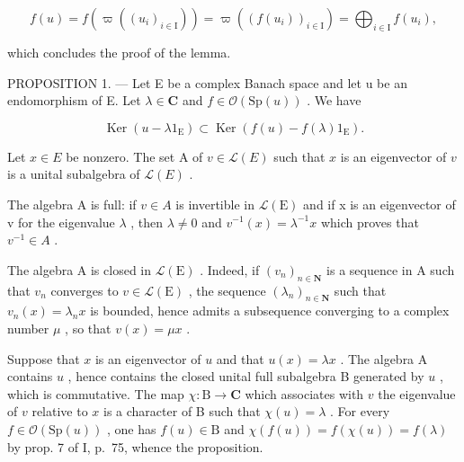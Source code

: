 \[
f (u) = f (\varpi ((u _ {i}) _ {i \in \mathrm{I}})) = \varpi ((f (u _ {i})) _ {i \in \mathrm{I}}) = \bigoplus_ {i \in \mathrm{I}} f (u _ {i}),
\]

which concludes the proof of the lemma.

PROPOSITION 1. --- Let E be a complex Banach space and let u be an endomorphism of E. Let \(\lambda \in \mathbf{C}\) and \(f \in \mathcal{O}(\mathrm{Sp}(u))\) . We have

\[
\operatorname{Ker} (u - \lambda 1 _ {\mathrm{E}}) \subset \operatorname{Ker} (f (u) - f (\lambda) 1 _ {\mathrm{E}}).
\]

Let \(x \in E\) be nonzero. The set A of \(v \in \mathcal{L}(E)\) such that \(x\) is an eigenvector of \(v\) is a unital subalgebra of \(\mathcal{L}(E)\) .

The algebra A is full: if \(v \in A\) is invertible in \(\mathcal{L}(\mathrm{E})\) and if x is an eigenvector of v for the eigenvalue \(\lambda\) , then \(\lambda \neq 0\) and \(v^{-1}(x) = \lambda^{-1}x\) which proves that \(v^{-1} \in A\) .

The algebra A is closed in \(\mathcal{L}(\mathrm{E})\) . Indeed, if \((v_n)_{n\in \mathbf{N}}\) is a sequence in A such that \(v_{n}\) converges to \(v\in \mathcal{L}(\mathrm{E})\) , the sequence \((\lambda_{n})_{n\in \mathbf{N}}\) such that \(v_{n}(x) = \lambda_{n}x\) is bounded, hence admits a subsequence converging to a complex number \(\mu\) , so that \(v(x) = \mu x\) .

Suppose that \(x\) is an eigenvector of \(u\) and that \(u(x) = \lambda x\) . The algebra A contains \(u\) , hence contains the closed unital full subalgebra B generated by \(u\) , which is commutative. The map \(\chi \colon \mathrm{B} \to \mathbf{C}\) which associates with \(v\) the eigenvalue of \(v\) relative to \(x\) is a character of B such that \(\chi(u) = \lambda\) . For every \(f \in \mathcal{O}(\mathrm{Sp}(u))\) , one has \(f(u) \in \mathrm{B}\) and \(\chi(f(u)) = f(\chi(u)) = f(\lambda)\) by prop. 7 of I, p.~75, whence the proposition.

